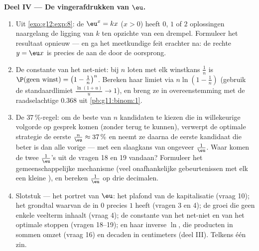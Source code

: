 \begin{problem}
\medskip
\noindent\textbf{Deel IV --- De vingerafdrukken van $\eu$.}
\begin{enumerate}[resume]
  \item Uit \cref{exo:g12:exp:8}: de  $\eu^x = kx$ ($x > 0$)
        heeft $0$, $1$ of $2$ oplossingen naargelang de ligging van $k$ ten
        opzichte van een drempel. Formuleer het resultaat opnieuw --- en ga
        het meetkundige feit erachter na: de rechte $y = \eu x$ is precies de
         aan de  door de oorsprong.
  \item De constante van het net-niet: bij $n$ loten met elk winstkans
        $\frac1n$ is $\P(\text{geen winst}) = \left(1 - \frac1n\right)^n$.
        Bereken haar limiet via $n \ln\!\left(1 - \frac1n\right)$ (gebruik de
        standaardlimiet $\frac{\ln(1 + u)}{u} \to 1$), en breng ze in
        overeenstemming met de raadselachtige $0.368$ uit
        \cref{pb:g11:binom:1}.
  \item De $37\,\%$-regel: om de beste van $n$ kandidaten te kiezen die in
        willekeurige volgorde op gesprek komen (zonder terug te kunnen),
        verwerpt de optimale strategie de eerste
        $\frac{n}{\eu} \approx 37\,\%$ en neemt ze daarna de eerste kandidaat
        die beter is dan alle vorige --- met een slaagkans van ongeveer
        $\frac1\eu$. Waar komen de twee $\frac1\eu$'s uit de vragen 18 en 19
        vandaan? Formuleer het gemeenschappelijke mechanisme (veel
        onafhankelijke gebeurtenissen met elk een kleine ), en bereken
        $\frac1\eu$ op drie decimalen.
  \item Slotstuk --- het portret van $\eu$: het plafond van de kapitalisatie
        (vraag 10); het grondtal waarvan de  in $0$ precies
         $1$ heeft (vragen 3 en 4); de groei die geen
        enkele veelterm inhaalt (vraag 4); de constante van het net-niet en
        van het optimale stoppen (vragen 18--19); en haar inverse $\ln$, die
        producten in sommen omzet (vraag 16) en decaden in centimeters (deel
        III). Telkens één zin.
\end{enumerate}
\end{problem}
